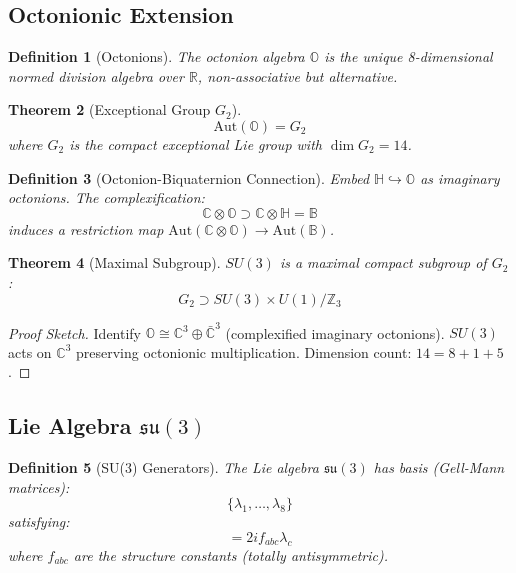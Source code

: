 \documentclass[12pt]{article}
\newtheorem{definition}{Definition}[section]
\newtheorem{theorem}[definition]{Theorem}
\newcommand{\B}{\mathbb{B}}
\newcommand{\C}{\mathbb{C}}
\newcommand{\R}{\mathbb{R}}
\renewcommand{\H}{\mathbb{H}}
\renewcommand{\O}{\mathbb{O}}
\newcommand{\su}{\mathfrak{su}}
\newcommand{\Aut}{\mathrm{Aut}}
\begin{document}
\subsection{Octonionic Extension}

\begin{definition}[Octonions]
The octonion algebra $\O$ is the unique 8-dimensional normed division algebra over $\R$, non-associative but alternative.
\end{definition}

\begin{theorem}[Exceptional Group $G_2$]
\begin{equation}
\Aut(\O) = G_2
\end{equation}
where $G_2$ is the compact exceptional Lie group with $\dim G_2 = 14$.
\end{theorem}

\begin{definition}[Octonion-Biquaternion Connection]
Embed $\H \hookrightarrow \O$ as imaginary octonions. The complexification:
\begin{equation}
\C \otimes \O \supset \C \otimes \H = \B
\end{equation}
induces a restriction map $\Aut(\C \otimes \O) \to \Aut(\B)$.
\end{definition}

\begin{theorem}[Maximal Subgroup]
$SU(3)$ is a maximal compact subgroup of $G_2$:
\begin{equation}
G_2 \supset SU(3) \times U(1) / \mathbb{Z}_3
\end{equation}
\end{theorem}

\begin{proof}[Proof Sketch]
Identify $\O \cong \C^3 \oplus \bar{\C}^3$ (complexified imaginary octonions). $SU(3)$ acts on $\C^3$ preserving octonionic multiplication. Dimension count: $14 = 8 + 1 + 5$.
\end{proof}

\subsection{Lie Algebra $\su(3)$}

\begin{definition}[SU(3) Generators]
The Lie algebra $\su(3)$ has basis (Gell-Mann matrices):
\begin{equation}
\{\lambda_1, \ldots, \lambda_8\}
\end{equation}
satisfying:
\begin{equation}
[\lambda_a, \lambda_b] = 2i f_{abc} \lambda_c
\end{equation}
where $f_{abc}$ are the structure constants (totally antisymmetric).
\end{definition}
\end{document}
